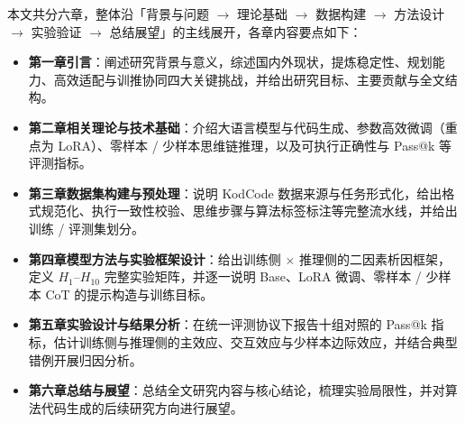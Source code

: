 
本文共分六章，整体沿「背景与问题 $\to$ 理论基础 $\to$ 数据构建 $\to$ 方法设计 $\to$ 实验验证 $\to$ 总结展望」的主线展开，各章内容要点如下：

\begin{itemize}
    \item \textbf{第一章\quad 引言}：阐述研究背景与意义，综述国内外现状，提炼稳定性、规划能力、高效适配与训推协同四大关键挑战，并给出研究目标、主要贡献与全文结构。
    \item \textbf{第二章\quad 相关理论与技术基础}：介绍大语言模型与代码生成、参数高效微调（重点为 LoRA）、零样本 / 少样本思维链推理，以及可执行正确性与 Pass@k 等评测指标。
    \item \textbf{第三章\quad 数据集构建与预处理}：说明 KodCode 数据来源与任务形式化，给出格式规范化、执行一致性校验、思维步骤与算法标签标注等完整流水线，并给出训练 / 评测集划分。
    \item \textbf{第四章\quad 模型方法与实验框架设计}：给出训练侧 $\times$ 推理侧的二因素析因框架，定义 $H_1$--$H_{10}$ 完整实验矩阵，并逐一说明 Base、LoRA 微调、零样本 / 少样本 CoT 的提示构造与训练目标。
    \item \textbf{第五章\quad 实验设计与结果分析}：在统一评测协议下报告十组对照的 Pass@k 指标，估计训练侧与推理侧的主效应、交互效应与少样本边际效应，并结合典型错例开展归因分析。
    \item \textbf{第六章\quad 总结与展望}：总结全文研究内容与核心结论，梳理实验局限性，并对算法代码生成的后续研究方向进行展望。
\end{itemize}